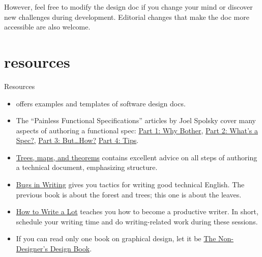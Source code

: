 \documentclass{article}
\begin{document}
However, feel free to modify the design doc if you change your mind or discover new challenges during development.
Editorial changes that make the doc more accessible are also welcome.

\section{resources}{Resources}

\begin{itemize}
\item \href{https://www.designdocs.dev/}{} offers examples and templates of software design docs.
\item The ``Painless Functional Specifications'' articles by Joel Spolsky cover many aspects of authoring a functional spec:
\href{https://www.joelonsoftware.com/2000/10/02/painless-functional-specifications-part-1-why-bother/}{Part 1: Why Bother},
\href{https://www.joelonsoftware.com/2000/10/03/painless-functional-specifications-part-2-whats-a-spec/}{Part 2: What's a Spec?},
\href{https://www.joelonsoftware.com/2000/10/04/painless-functional-specifications-part-3-but-how/}{Part 3: But\ldots  How?}
\href{https://www.joelonsoftware.com/2000/10/15/painless-functional-specifications-part-4-tips/}{Part 4: Tips}.
\item \href{https://www.principiae.be/X0100.php}{Trees, maps, and theorems} contains excellent advice on all steps of authoring a technical document, emphasizing structure.
\item \href{https://www.amazon.com/gp/product/020137921X}{Bugs in Writing} gives you tactics for writing good technical English.
The previous book is about the forest and trees; this one is about the leaves.
\item \href{https://www.amazon.com/gp/product/1433829738}{How to Write a Lot} teaches you how to become a productive writer.
In short, schedule your writing time and do writing-related work during these sessions.
\item If you can read only one book on graphical design, let it be \href{https://www.amazon.com/gp/product/1566091594}{The Non-Designer's Design Book}.
\end{itemize}

\end{document}
